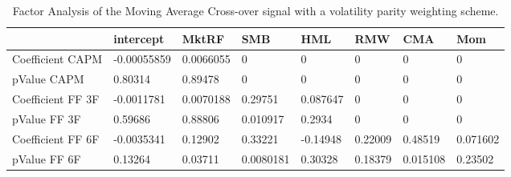 \begin{table}[H]
\centering
\begin{tabular}{llllllll}
& intercept & MktRF & SMB & HML & RMW & CMA & Mom \\ 
\hline 
Coefficient CAPM & -0.00055859 & 0.0066055 & 0 & 0 & 0 & 0 & 0 \\ 
pValue CAPM & 0.80314 & 0.89478 & 0 & 0 & 0 & 0 & 0 \\ 
Coefficient FF 3F & -0.0011781 & 0.0070188 & 0.29751 & 0.087647 & 0 & 0 & 0 \\ 
pValue FF 3F & 0.59686 & 0.88806 & 0.010917 & 0.2934 & 0 & 0 & 0 \\ 
Coefficient FF 6F & -0.0035341 & 0.12902 & 0.33221 & -0.14948 & 0.22009 & 0.48519 & 0.071602 \\ 
pValue FF 6F & 0.13264 & 0.03711 & 0.0080181 & 0.30328 & 0.18379 & 0.015108 & 0.23502 \\ 
\hline
\end{tabular}
\caption{Factor Analysis of the Moving Average Cross-over signal with a volatility parity weighting scheme.}
\label{MAVP_FACTOR}
\end{table}